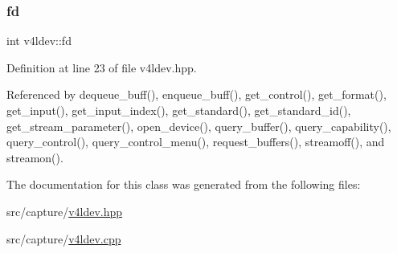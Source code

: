 \subsubsection{\texorpdfstring{fd}{fd}}
{\footnotesize\ttfamily int v4ldev\+::fd\hspace{0.3cm}{\ttfamily [private]}}



Definition at line 23 of file v4ldev.\+hpp.



Referenced by dequeue\+\_\+buff(), enqueue\+\_\+buff(), get\+\_\+control(), get\+\_\+format(), get\+\_\+input(), get\+\_\+input\+\_\+index(), get\+\_\+standard(), get\+\_\+standard\+\_\+id(), get\+\_\+stream\+\_\+parameter(), open\+\_\+device(), query\+\_\+buffer(), query\+\_\+capability(), query\+\_\+control(), query\+\_\+control\+\_\+menu(), request\+\_\+buffers(), streamoff(), and streamon().



The documentation for this class was generated from the following files\+:\begin{DoxyCompactItemize}
\item 
src/capture/\hyperlink{v4ldev_8hpp}{v4ldev.\+hpp}\item 
src/capture/\hyperlink{v4ldev_8cpp}{v4ldev.\+cpp}\end{DoxyCompactItemize}
